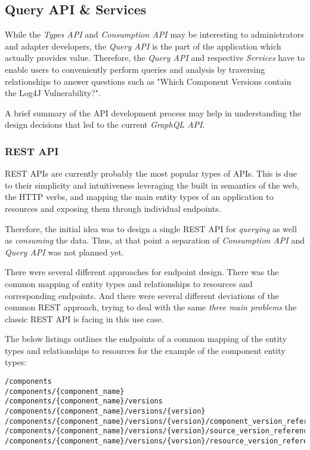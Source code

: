 \subsection{Query API \& Services} \label{sec:Query API & Services}
While the \emph{Types API} and \emph{Consumption API} may be interesting to administrators and adapter developers, the \emph{Query API} is the part of the application which actually provides value. Therefore, the \emph{Query API} and respective \emph{Services} have to enable users to conveniently perform queries and analysis by traversing relationships to answer questions such as "Which Component Versions contain the Log4J Vulnerability?".\par
A brief summary of the API development process may help in understanding the design decisions that led to the current \emph{GraphQL API}. 

\subsubsection{REST API}
REST APIs are currently probably the most popular types of APIs. This is due to their simplicity and intuitiveness leveraging the built in semantics of the web, the HTTP verbs, and mapping the main entity types of an application to resources and exposing them through individual endpoints.\par
Therefore, the initial idea was to design a single REST API for \emph{querying} as well as \emph{consuming} the data. Thus, at that point a separation of \emph{Consumption API} and \emph{Query API} was not planned yet.\par 
There were several different approaches for endpoint design. There was the common mapping of entity types and relationships to resources and corresponding endpoints. And there were several different deviations of the common REST approach, trying to deal with the same \emph{three main problems} the classic REST API is facing in this use case.\par 
The below listings outlines the endpoints of a common mapping of the entity types and relationships to resources for the example of the component entity types:

\begin{lstlisting}[basicstyle=\tiny, caption=REST API Endpoints, captionpos=b, label=lst:RESTAPIEndpoints]
/components
/components/{component_name}
/components/{component_name}/versions
/components/{component_name}/versions/{version}
/components/{component_name}/versions/{version}/component_version_references
/components/{component_name}/versions/{version}/source_version_references
/components/{component_name}/versions/{version}/resource_version_references
\end{lstlisting}

